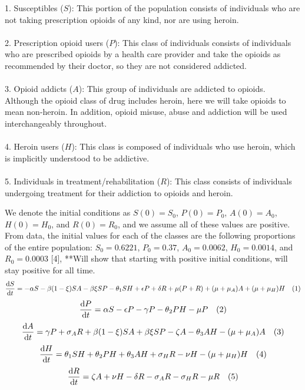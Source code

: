 \documentclass[12pt]{article}
\begin{document}
1. Susceptibles ($S$): This portion of the population consists of individuals who are not taking prescription opioids of any kind, nor are using heroin. \\ \\
2. Prescription opioid users ($P$): This class of individuals consists of individuals who are prescribed opioids by a health care provider and take the opioids as recommended by their doctor, so they are not considered addicted. \\ \\
3. Opioid addicts ($A$): This group of individuals are addicted to opioids. Although the opioid class of drug includes heroin, here we will take opioids to mean non-heroin. In addition, opioid misuse, abuse and addiction will be used interchangeably throughout.  \\ \\
4. Heroin users ($H$): This class is composed of individuals who use heroin, which is implicitly understood to be addictive. \\ \\
5. Individuals in treatment/rehabilitation ($R$): This class consists of individuals undergoing treatment for their addiction to opioids and heroin. 

We denote the initial conditions as
$S(0)=S_{0}$, $P(0)=P_{0}$, $A(0)=A_{0}$, $H(0)=H_{0}$, and $R(0)=R_{0}$, and we assume all of these values are positive. From data, the initial values for each of the classes are the following proportions of the entire population: $S_{0}=0.6221$, $P_{0}=0.37$, $A_{0}=0.0062$, $H_{0}=0.0014$, and $R_{0}=0.0003$ [4],  **Will show that starting with positive initial conditions, will stay positive for all time. \\
\[\dv{S}{t} = -\alpha S - \beta (1- \xi) SA  -\beta \xi SP- \theta_{1} SH +\epsilon P +\delta R +\mu (P+R) + (\mu+\mu_{A})A + (\mu+\mu_{H}) H \quad (1)\] 
\[\dv{P}{t} = \alpha S - \epsilon P  - \gamma P - \theta_{2}PH- \mu P    \quad(2)\]
\[\dv{A}{t} = \gamma P + \sigma_{A} R +\beta (1- \xi) SA  +\beta \xi SP -\zeta A - \theta_{3}AH-(\mu + \mu_{A})A   \quad (3)\]
\[\dv{H}{t} = \theta_{1}SH+\theta_{2}PH+\theta_{3}AH + \sigma_{H}R-\nu H-(\mu+\mu_{H})H  \quad (4)\]
\[\dv{R}{t} = \zeta A +\nu H -\delta R -\sigma_{A}R-\sigma_{H}R -\mu R\quad(5)\]
\end{document}
